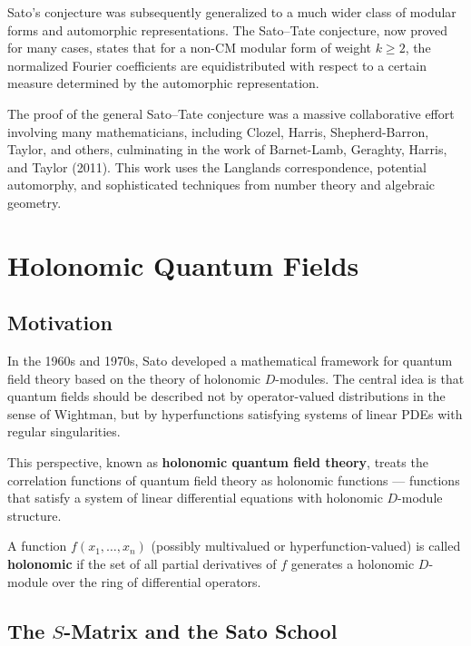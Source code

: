 Sato's conjecture was subsequently generalized to a much wider class of modular forms and automorphic representations. The Sato--Tate conjecture, now proved for many cases, states that for a non-CM modular form of weight \(k \geq 2\), the normalized Fourier coefficients are equidistributed with respect to a certain measure determined by the automorphic representation.

The proof of the general Sato--Tate conjecture was a massive collaborative effort involving many mathematicians, including Clozel, Harris, Shepherd-Barron, Taylor, and others, culminating in the work of Barnet-Lamb, Geraghty, Harris, and Taylor (2011). This work uses the Langlands correspondence, potential automorphy, and sophisticated techniques from number theory and algebraic geometry.

\section{Holonomic Quantum Fields}

\subsection{Motivation}

In the 1960s and 1970s, Sato developed a mathematical framework for quantum field theory based on the theory of holonomic \(D\)-modules. The central idea is that quantum fields should be described not by operator-valued distributions in the sense of Wightman, but by hyperfunctions satisfying systems of linear PDEs with regular singularities.

This perspective, known as \textbf{holonomic quantum field theory}, treats the correlation functions of quantum field theory as holonomic functions --- functions that satisfy a system of linear differential equations with holonomic \(D\)-module structure.

\begin{definition}
A function \(f(x_1,\dots,x_n)\) (possibly multivalued or hyperfunction-valued) is called \textbf{holonomic} if the set of all partial derivatives of \(f\) generates a holonomic \(D\)-module over the ring of differential operators.
\end{definition}

\subsection{The \texorpdfstring{\(S\)}{S}-Matrix and the Sato School}

